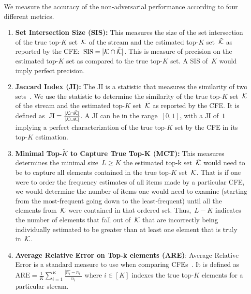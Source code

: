 We measure the accuracy of the non-adversarial performance according to four different metrics.

\begin{enumerate}
    \item \textbf{Set Intersection Size (SIS):} This measures the size of the set intersection of the true top-$K$ set~$\mathcal{K}$ of the stream and the estimated top-$K$ set~$\tilde{\mathcal{K}}$ as reported by the CFE:~$\text{SIS} = |\mathcal{K} \cap \tilde{\mathcal{K}}|$. This is measure of precision on the estimated top-$K$ set as compared to the true top-$K$ set. A SIS of~$K$ would imply perfect precision. 
    
    \item \textbf{Jaccard Index (JI):} The JI is a statistic that measures the similarity of two sets~\cite{real1996probabilistic}. We use the statistic to determine the similarity of the true top-$K$ set~$\mathcal{K}$ of the stream and the estimated top-$K$ set~$\tilde{\mathcal{K}}$ as reported by the CFE. It is defined as~$\mathrm{JI} = \frac{|\mathcal{K} \cap \tilde{\mathcal{K}}|}{|\mathcal{K} \cup \tilde{\mathcal{K}}|}$. A JI can be in the range~$[0,1]$, with a JI of~$1$ implying a perfect characterization of the true top-$K$ set by the CFE in its top-$K$ estimation. 
    
    \item \textbf{Minimal Top-$\tilde{K}$ to Capture True Top-K (MCT):} 
    This measures determines the minimal size~$L \geq K$ the estimated top-k set~$\tilde{\mathcal{K}}$ would need to be to capture all elements contained in the true top-$K$ set~$\mathcal{K}$. That is if one were to order the frequency estimates of all items made by a particular CFE, we would determine the number of items one would need to examine (starting from the most-frequent going down to the least-frequent) until all the elements from~$\mathcal{K}$ were contained in that ordered set. Thus,~$L-K$ indicates the number of elements that fall out of~$\mathcal{K}$ that are incorrectly being individually estimated to be greater than at least one element that is truly in~$\mathcal{K}$. 
    
    \item \textbf{Average Relative Error on Top-k  elements (ARE)}:
    Average Relative Error is a standard measure to use when comparing CFEs~\cite{yang2019heavykeeper}. It is defined as~$\mathrm{ARE} = \frac{1}{K} \sum_{i=1}^{K} \frac{| \hat{n_{i}} - n_{i}|}{n_{i}}$
    where $i \in [K]$ indexes the true top-$K$ elements for a particular stream.
\end{enumerate}

